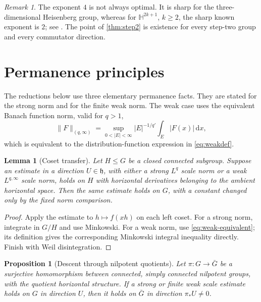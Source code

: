 \documentclass[11pt]{article}
\newtheorem{proposition}[theorem]{Proposition}
\newtheorem{lemma}[theorem]{Lemma}
\theoremstyle{definition}
\theoremstyle{remark}
\newtheorem{remark}[theorem]{Remark}
\newcommand{\h}{\mathfrak h}
\newcommand{\dd}{\,\mathrm d}
\newcommand{\abs}[1]{\lvert #1\rvert}
\newcommand{\norm}[1]{\lVert #1\rVert}
\begin{document}
\begin{remark}
The exponent \(4\) is not always optimal.  It is sharp for the three-dimensional
Heisenberg group, whereas for \(\mathbb H^{2k+1}\), \(k\ge2\), the sharp known exponent is
\(2\); see \cite{NaorYoung2018,NaorYoung2022}.  The point of \cref{thm:step2} is
existence for every step-two group and every commutator direction.
\end{remark}

\section{Permanence principles}\label{sec:permanence}

The reductions below use three elementary permanence facts.  They are stated for the
strong norm and for the finite weak norm.  The weak case uses the equivalent Banach
function norm, valid for \(q>1\),
\begin{equation}\label{eq:weak-equivalent}
 \norm{F}_{(q,\infty)}=
 \sup_{0<\abs E<\infty}\abs E^{-1/q'}\int_E\abs{F(x)}\dd x,
\end{equation}
which is equivalent to the distribution-function expression in \eqref{eq:weakdef}.

\begin{lemma}[Coset transfer]\label{lem:coset}
Let \(H\le G\) be a closed connected subgroup.  Suppose an estimate in a direction
\(U\in\h\), with either a strong \(L^q\) scale norm or a weak \(L^{q,\infty}\) scale norm,
holds on \(H\) with horizontal derivatives belonging to the ambient horizontal space.
Then the same estimate holds on \(G\), with a constant changed only by the fixed norm
comparison.
\end{lemma}

\begin{proof}
Apply the estimate to \(h\mapsto f(xh)\) on each left coset.  For a strong norm, integrate
in \(G/H\) and use Minkowski.  For a weak norm, use \eqref{eq:weak-equivalent}; its
definition gives the corresponding Minkowski integral inequality directly.  Finish with
Weil disintegration.
\end{proof}

\begin{proposition}[Descent through nilpotent quotients]\label{prop:quotient}
Let \(\pi:G\to\bar G\) be a surjective homomorphism between connected, simply
connected nilpotent groups, with the quotient horizontal structure.  If a strong or finite
weak scale estimate holds on \(G\) in direction \(U\), then it holds on \(\bar G\) in
direction \(\pi_*U\ne0\).
\end{proposition}
\end{document}
